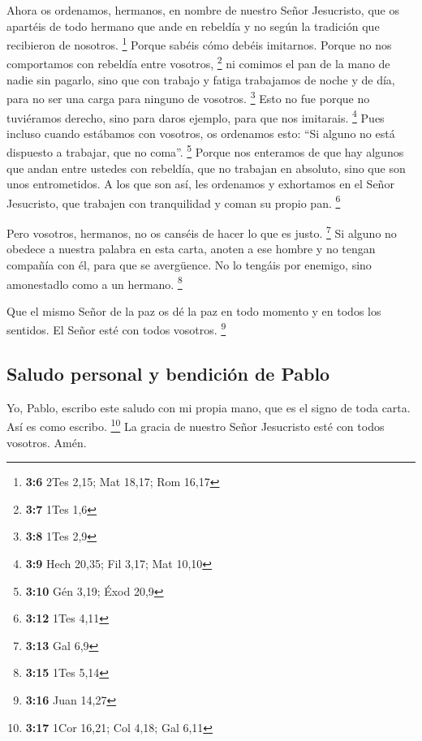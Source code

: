  Ahora os ordenamos, hermanos, en nombre de nuestro Señor
Jesucristo, que os apartéis de todo hermano que ande en rebeldía y no
según la tradición que recibieron de nosotros. \footnote{\textbf{3:6}
  2Tes 2,15; Mat 18,17; Rom 16,17}  Porque sabéis cómo
debéis imitarnos. Porque no nos comportamos con rebeldía entre vosotros,
\footnote{\textbf{3:7} 1Tes 1,6}  ni comimos el pan de la
mano de nadie sin pagarlo, sino que con trabajo y fatiga trabajamos de
noche y de día, para no ser una carga para ninguno de vosotros.
\footnote{\textbf{3:8} 1Tes 2,9}  Esto no fue porque no
tuviéramos derecho, sino para daros ejemplo, para que nos imitarais.
\footnote{\textbf{3:9} Hech 20,35; Fil 3,17; Mat 10,10} 
Pues incluso cuando estábamos con vosotros, os ordenamos esto: ``Si
alguno no está dispuesto a trabajar, que no coma''. \footnote{\textbf{3:10}
  Gén 3,19; Éxod 20,9}  Porque nos enteramos de que hay
algunos que andan entre ustedes con rebeldía, que no trabajan en
absoluto, sino que son unos entrometidos.  A los que son
así, les ordenamos y exhortamos en el Señor Jesucristo, que trabajen con
tranquilidad y coman su propio pan. \footnote{\textbf{3:12} 1Tes 4,11}

 Pero vosotros, hermanos, no os canséis de hacer lo que
es justo. \footnote{\textbf{3:13} Gal 6,9}  Si alguno no
obedece a nuestra palabra en esta carta, anoten a ese hombre y no tengan
compañía con él, para que se avergüence.  No lo tengáis
por enemigo, sino amonestadlo como a un hermano. \footnote{\textbf{3:15}
  1Tes 5,14}

 Que el mismo Señor de la paz os dé la paz en todo
momento y en todos los sentidos. El Señor esté con todos vosotros.
\footnote{\textbf{3:16} Juan 14,27}

\hypertarget{saludo-personal-y-bendiciuxf3n-de-pablo}{%
\subsection{Saludo personal y bendición de
Pablo}\label{saludo-personal-y-bendiciuxf3n-de-pablo}}

 Yo, Pablo, escribo este saludo con mi propia mano, que
es el signo de toda carta. Así es como escribo. \footnote{\textbf{3:17}
  1Cor 16,21; Col 4,18; Gal 6,11}  La gracia de nuestro
Señor Jesucristo esté con todos vosotros. Amén.
